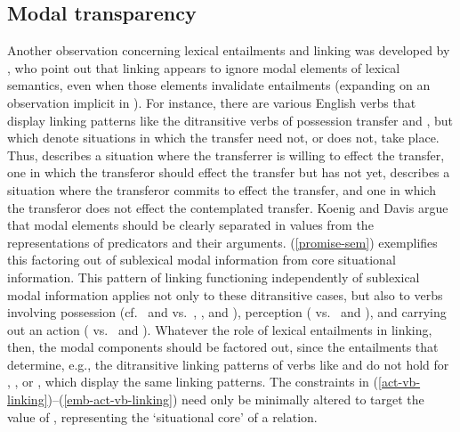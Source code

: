 \documentclass[output=paper
	        ,collection
	        ,collectionchapter
 	        ,biblatex
                ,babelshorthands
                ,newtxmath
                ,draftmode
                ,colorlinks, citecolor=brown
]{langscibook}
\begin{document}
\subsection{Modal transparency}
Another observation concerning lexical entailments  and linking was developed by \citet{KoenigandDavis2001}, who point out that linking appears to ignore modal elements of lexical semantics, even when those elements invalidate entailments (expanding on an observation implicit in \citealt{Goldberg1995}).
For instance, there are various English verbs that display linking patterns like the ditransitive  verbs of possession transfer  and , but which denote situations in which the transfer need not, or does not, take place.
Thus,  describes a situation where the transferrer is willing to effect the transfer,  one in which the transferor should effect the transfer but has not yet,  describes a situation where the transferor commits to effect the transfer, and  one in which the transferor does not effect the contemplated transfer. 
Koenig and Davis argue that modal elements should be clearly separated in \content values from the representations of predicators and their arguments.  (\ref{promise-sem}) exemplifies this factoring out of sublexical modal information from core situational information. This pattern of linking functioning independently of sublexical modal information applies not only to these ditransitive cases, but also to verbs involving possession (cf.\  and  vs.\ , , and ), perception ( vs.\  and ), and carrying out an action ( vs.\  and ).  Whatever the role of lexical entailments in linking, then, the modal components should be factored out, since the entailments that determine, e.g., the ditransitive linking patterns of verbs like  and  do not hold for , , or , which display the same linking patterns. The constraints in (\ref{act-vb-linking})--(\ref{emb-act-vb-linking}) need only be minimally altered to target the value of , representing the `situational core' of a relation.
\end{document}
